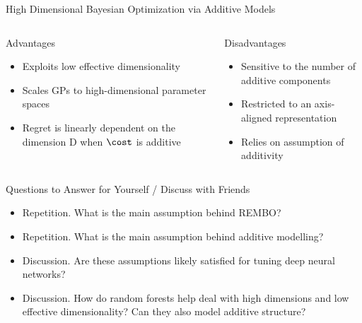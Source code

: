 \begin{frame}[c]{High Dimensional Bayesian Optimization via Additive Models}
\begin{columns}[T] %
\begin{column}{.48\textwidth}


    \begin{block}{Advantages}
    \begin{itemize}
    	\item Exploits low effective dimensionality
    	\item Scales GPs to high-dimensional parameter spaces
    	\item Regret is linearly dependent on the dimension D when $\cost$ is additive
    \end{itemize}
    \end{block}
\pause
\end{column}%

\hfill%

\begin{column}{.48\textwidth}

    \begin{block}{Disadvantages}
    \begin{itemize}
    	\item Sensitive to the number of additive components
    	\item Restricted to an axis-aligned representation
        \item Relies on assumption of additivity
    \end{itemize}
\end{block}

\end{column}
\end{columns}   
\end{frame}


\begin{frame}[c]{Questions to Answer for Yourself / Discuss with Friends}

\begin{itemize}

\item \alert{Repetition.} What is the main assumption behind REMBO?
\medskip

\item \alert{Repetition.} What is the main assumption behind additive modelling? 
\medskip

\item \alert{Discussion.} Are these assumptions likely satisfied for tuning deep neural networks?
\medskip

\item \alert{Discussion.} How do random forests help deal with high dimensions and low effective dimensionality? Can they also model additive structure?


\end{itemize}
\end{frame}